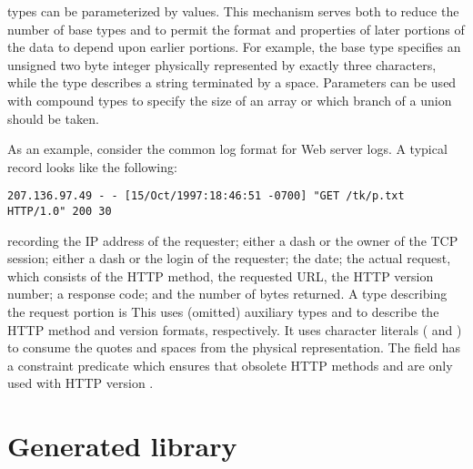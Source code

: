 \pads{} types can be parameterized by values.
This mechanism
serves both to reduce the number of base types and to permit the
format and properties of later portions of the data to depend upon earlier portions.
For example, 
the base type  specifies an unsigned two byte integer
physically represented by exactly three characters, while the type
describes a string terminated by a space.  Parameters can be 
used with compound types to specify the size of an array or which
branch of a union should be taken.


As an example, consider the common log format for Web server logs.  A
typical record looks like the following:
\begin{verbatim}
207.136.97.49 - - [15/Oct/1997:18:46:51 -0700] "GET /tk/p.txt HTTP/1.0" 200 30
\end{verbatim}

\noindent
recording the IP address of the requester; either a dash or the owner
of the TCP session; either a dash or the login of the requester; the
date; the actual request, which consists of the HTTP method, the
requested URL, the HTTP version number; a response code; and the
number of bytes returned.  A \PADSL{} type describing the request
portion is
This \pstruct{} uses (omitted) auxiliary types  and
 to describe
the HTTP method and version formats, respectively.
It uses character literals ( and ) to consume
the quotes and 
spaces from the physical representation. 
The  field has a constraint predicate 
which ensures that obsolete HTTP methods  and  
are only used with HTTP version .

\section{Generated library}
\begin{latexonly}
\end{latexonly}

